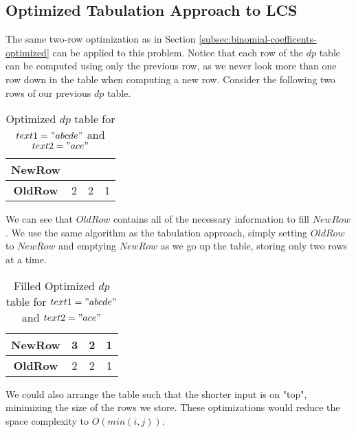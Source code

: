 \subsection{Optimized Tabulation Approach to LCS}\label{subsec:lcs-optimized}
The same two-row optimization as in Section \ref{subsec:binomial-coefficents-optimized} can be applied to this problem.
Notice that each row of the $dp$ table can be computed using only the previous row, as we never look more than one row down in the table when computing a new row.
Consider the following two rows of our previous $dp$ table.
\begin{table}[H]
    \centering
    \begin{tabular}{|c|c|c|c|}
        \hline
        \textbf{NewRow} & $\phantom{0}$ & $\phantom{0}$ & $\phantom{0}$ \\
        \hline
        \textbf{OldRow} & 2 & 2 & 1  \\
        \hline
    \end{tabular}
    \caption{Optimized $dp$ table for $text1="abcde"$ and $text2="ace"$}
\end{table}

We can see that $OldRow$ contains all of the necessary information to fill $NewRow$.
We use the same algorithm as the tabulation approach, simply setting $OldRow$ to $NewRow$ and emptying $NewRow$ as we go up the table,
storing only two rows at a time.

\begin{table}[H]
    \centering
    \begin{tabular}{|c|c|c|c|}
        \hline
        \textbf{NewRow} & 3 & 2 & 1 \\
        \hline
        \textbf{OldRow} & 2 & 2 & 1  \\
        \hline
    \end{tabular}
    \caption{Filled Optimized $dp$ table for $text1="abcde"$ and $text2="ace"$}
\end{table}

We could also arrange the table such that the shorter input is on "top", minimizing the size of the rows we store. These optimizations would reduce the space complexity to $O(min(i,j))$.



